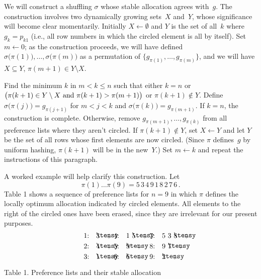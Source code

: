 We will construct a shuffling $\sigma$ whose stable allocation agrees with~$g$.
The construction involves two dynamically growing sets~$X$ and~$Y$, whose
significance will become clear momentarily. Initially 
$X\leftarrow\emptyset$ and $Y$
is the set of all~$k$ where $g_k=p_{k1}$ (i.e., all row numbers in which the
circled element is all by itself). Set $m\leftarrow 0$; as the construction
proceeds, we will have defined
$\sigma\bigl(\pi(1)\bigr),\ldots,\sigma\bigl(\pi(m)\bigr)$ as a permutation of
$\{g_{\pi(1)},\ldots,g_{\pi(m)}\}$, and we will have $X\subseteq Y$,
$\pi(m+1)\in Y\setminus X$.

Find the minimum $k$ in $m<k\leq n$ such that either $k=n$ or
$\bigl(\pi(k+1)\in Y\setminus X \hbox{ and } \pi(k+1)>\pi(m+1)\bigr)$ or
$\pi(k+1)\not\in Y$. Define $\sigma\bigl(\pi(j)\bigr)=g_{\pi(j+1)}$ for
$m<j<k$ and $\sigma\bigl(\pi(k)\bigr)=g_{\pi(m+1)}$. If $k=n$, the construction
is complete. Otherwise, remove $g_{\pi(m+1)},\ldots,g_{\pi(k)}$ from all
preference lists where they aren't circled. If $\pi(k+1)\not\in Y$, set
$X\leftarrow Y$ and let $Y$ be the set of all rows whose first elements are now
circled. (Since $\pi$ defines~$g$ by uniform hashing, $\pi(k+1)$ will be in the
new~$Y$.) Set $m\gets k$ and repeat the instructions of this paragraph.

A worked example will help clarify this construction.
Let
$$\pi(1)\ldots\pi(9)=5\,3\,4\,9\,1\,8\,2\,7\,6\,.$$
 Table 1 shows a sequence
of preference lists for $n=9$ in which $\pi$ defines the locally optimum
allocation indicated by circled elements. All elements to the right of the
circled ones have been erased, since they are irrelevant for our present
purposes.
$$\vcenter{\halign{#\hfil\quad&$#$\hfil\qquad
&#\hfil\quad&$#$\hfil\ &$#$\hfil\qquad
&#\hfil\quad&$#$\hfil\ &$#$\hfil\ &$#$\hfil\cr
1:&\cd 3&4:&1&\cd 5&7:&5&3&\cd 8\cr
\noalign{\smallskip}
2:&\cd4&5:&\cd9&&8:&9&\cd7\cr
\noalign{\smallskip} 
3:&\cd1&6:&\cd6&&9:&\cd2\cr}}$$
\centerline{Table 1. Preference lists and their stable allocation}


